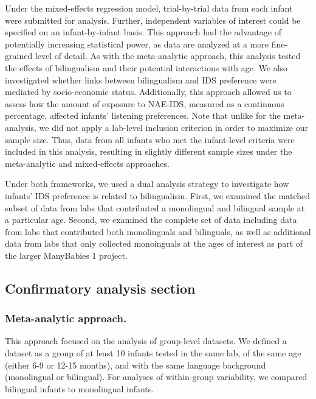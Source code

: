 \documentclass[english,,man,floatsintext]{apa6}
\begin{document}
Under the mixed-effects regression model, trial-by-trial data from each infant were submitted for analysis. Further, independent variables of interest could be specified on an infant-by-infant basis. This approach had the advantage of potentially increasing statistical power, as data are analyzed at a more fine-grained level of detail. As with the meta-analytic approach, this analysis tested the effects of bilingualism and their potential interactions with age. We also investigated whether links between bilingualism and IDS preference were mediated by socio-economic status. Additionally, this approach allowed us to assess how the amount of exposure to NAE-IDS, measured as a continuous percentage, affected infants' listening preferences. Note that unlike for the meta-analysis, we did not apply a lab-level inclusion criterion in order to maximize our sample size. Thus, data from all infants who met the infant-level criteria were included in this analysis, resulting in slightly different sample sizes under the meta-analytic and mixed-effects approaches.

Under both frameworks, we used a dual analysis strategy to investigate how infants' IDS preference is related to bilingualism. First, we examined the matched subset of data from labs that contributed a monolingual and bilingual sample at a particular age. Second, we examined the complete set of data including data from labs that contributed both monolinguals and bilinguals, as well as additional data from labs that only collected monoinguals at the ages of interest as part of the larger ManyBabies 1 project.

\hypertarget{confirmatory-analysis-section}{%
\subsection{Confirmatory analysis section}\label{confirmatory-analysis-section}}

\hypertarget{meta-analytic-approach.}{%
\subsubsection{Meta-analytic approach.}\label{meta-analytic-approach.}}

This approach focused on the analysis of group-level datasets. We defined a dataset as a group of at least 10 infants tested in the same lab, of the same age (either 6-9 or 12-15 months), and with the same language background (monolingual or bilingual). For analyses of within-group variability, we compared bilingual infants to monolingual infants.
\end{document}
